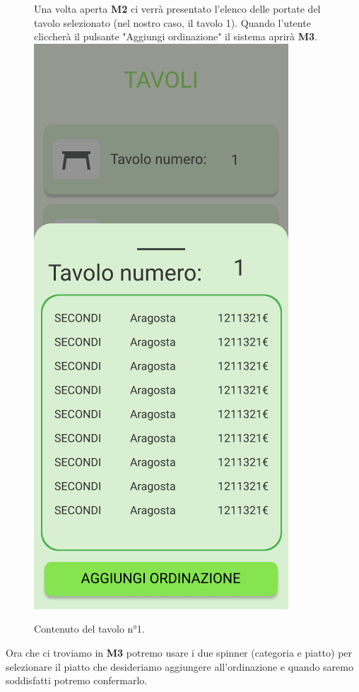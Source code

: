 \begin{figure}[H]
  Una volta aperta \textbf{M2} ci verrà presentato l'elenco delle portate del tavolo selezionato (nel nostro caso, il tavolo 1). Quando l'utente cliccherà il pulsante "Aggiungi ordinazione" il sistema aprirà \textbf{M3}.
  \centering
  \includegraphics[scale=0.6]{img/mock-up/Table_content.png}
  \caption{Contenuto del tavolo n°1.}
\end{figure}\newpage
Ora che ci troviamo in \textbf{M3} potremo usare i due spinner (categoria e piatto) per selezionare il piatto che desideriamo aggiungere all'ordinazione e quando saremo soddisfatti potremo confermarlo.
